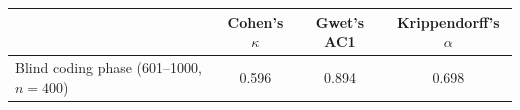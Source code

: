 \begin{tabular}{lccc}
\toprule
 & Cohen's $\kappa$ & Gwet's AC1 & Krippendorff's $\alpha$ \\
\midrule
Blind coding phase (601--1000, $n=400$) & 0.596 & 0.894 & 0.698 \\
\bottomrule
\end{tabular}